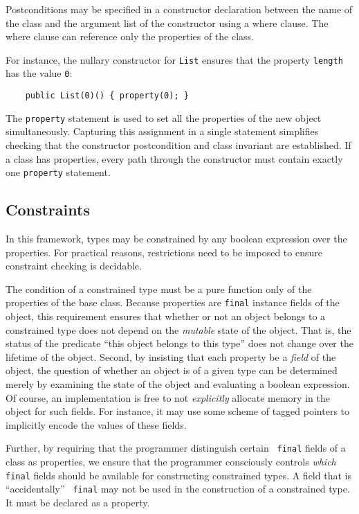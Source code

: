 Postconditions may be specified in a constructor declaration between
the name of the class and the argument list of the constructor using a
where clause. The where clause can reference only the properties of
the class.

For instance, the
nullary constructor for {\tt List} ensures that the property
{\tt length} has the value {\tt 0}:
{\footnotesize
\begin{verbatim}
    public List(0)() { property(0); }
\end{verbatim}}
The {\tt property} statement is used to set all the properties
of the new object simultaneously.  Capturing this assignment in
a single statement simplifies checking that the constructor
postcondition and class invariant are established.  If a class
has properties, every path through the constructor must contain
exactly one {\tt property} statement.



\subsection{Constraints}

In this framework, types may be constrained by any boolean
expression over the properties.  For practical reasons,
restrictions need to be imposed to ensure constraint checking is
decidable.

The condition of a constrained type must be a pure
function only of the properties of the base class.
Because properties are
{\tt final} instance fields of the object,
this requirement
ensures that whether or not an object belongs to a constrained type does
not depend on the {\em mutable} state of the object.
That is, the status of the
predicate ``this object belongs to this type'' does not
change over the lifetime of the object.  Second, by insisting that each
property be a {\em field} of the object, the question of
whether an object is of a given type can be
determined merely by examining the state of the object and evaluating
a boolean expression. Of course, an implementation is free to not {\em
explicitly} allocate memory in the object for such fields. For
instance, it may use some scheme of tagged pointers to implicitly
encode the values of these fields.

Further, by requiring that the programmer distinguish certain {\tt
final} fields of a class as properties, we ensure that the programmer
consciously controls {\em which} {\tt final} fields should be available for
constructing constrained types. A field that is ``accidentally'' {\tt
final} may not be used in the construction of a constrained type. It must be
declared as a property.

